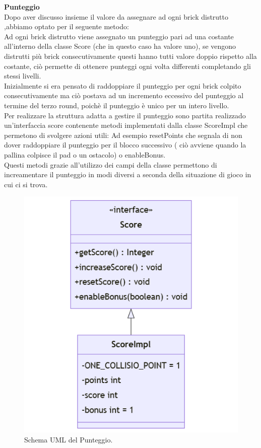 \documentclass[a4paper,12pt]{report}
\begin{document}
\pagebreak
\textbf{Punteggio}\\
Dopo aver discusso insieme il valore da assegnare ad ogni brick distrutto ,abbiamo optato per il seguente metodo:
\\Ad ogni brick distrutto viene assegnato un punteggio pari ad una costante all'interno della classe Score (che in questo caso ha valore uno), se vengono distrutti più brick consecutivamente questi hanno tutti valore doppio rispetto alla costante, ciò permette di ottenere punteggi ogni volta differenti completando gli stessi livelli.
\\Inizialmente si era pensato di raddoppiare il punteggio per ogni brick colpito consecutivamente ma ciò postava ad un incremento eccessivo del punteggio al termine del terzo round, poichè il punteggio è unico per un intero livello.
\\Per realizzare la struttura adatta a gestire il punteggio sono partita realizzado un'interfaccia score contenente metodi implementati dalla classe ScoreImpl che permetono di svolgere azioni utili: Ad esempio resetPoints che segnala di non dover raddoppiare il punteggio per il blocco successivo ( ciò avviene quando la pallina colpisce il pad o un ostacolo) o enableBonus.
\\Questi metodi grazie all'utilizzo dei campi della classe permettono di increamentare il punteggio in modi diversi a seconda della situazione di gioco in cui ci si trova.
\begin{figure}[H]
    \centering{}
    \includegraphics[scale=0.6]{images/Score.png}
    \caption{Schema UML del Punteggio.}
    \label{images:Score}
\end{figure}
\end{document}
